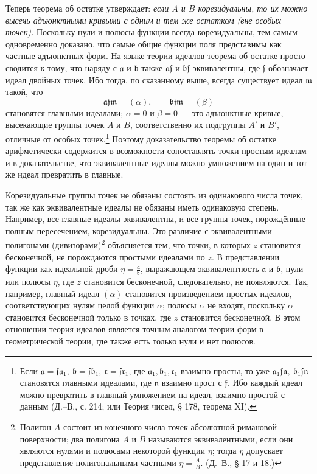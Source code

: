 \documentclass[11pt]{article}
\providecommand{\frf}{\mathfrak f}
\providecommand{\fra}{\mathfrak a}
\providecommand{\frb}{\mathfrak b}
\providecommand{\frr}{\mathfrak r}
\providecommand{\frm}{\mathfrak m}
\begin{document}
Теперь теорема об остатке утверждает: \emph{если \(A\) и \(B\) корезидуальны, то их можно высечь адъюнктными кривыми с одним и тем же остатком (вне особых точек).} Поскольку нули и полюсы функции всегда корезидуальны, тем самым одновременно доказано, что самые общие функции поля представимы как частные адъюнктных форм. На языке теории идеалов теорема об остатке просто сводится к тому, что наряду с \(\fra\) и \(\frb\) также \(\fra\frf\) и \(\frb\frf\) эквивалентны, где \(\frf\) обозначает идеал двойных точек. Ибо тогда, по сказанному выше, всегда существует идеал \(\frm\) такой, что
\[
\fra\frf\frm=(\alpha),\qquad \frb\frf\frm=(\beta)
\]
становятся главными идеалами; \(\alpha=0\) и \(\beta=0\) --- это адъюнктные кривые, высекающие группы точек \(A\) и \(B\), соответственно их подгруппы \(A'\) и \(B'\), отличные от особых точек.\footnote{Если \(\fra=\frf\fra_1,\ \frb=\frf\frb_1,\ \frr=\frf\frr_1\), где \(\fra_1,\frb_1,\frr_1\) взаимно просты, то уже \(\fra_1\frf\mathfrak n,\ \frb_1\frf\mathfrak n\) становятся главными идеалами, где \(\mathfrak n\) взаимно прост с \(\frf\). Ибо каждый идеал можно превратить в главный умножением на идеал, взаимно простой с данным (Д.--В., с. 214; или Теория чисел, § 178, теорема XI).} Поэтому доказательство теоремы об остатке арифметически содержится в возможности сопоставлять точки простым идеалам и в доказательстве, что эквивалентные идеалы можно умножением на один и тот же идеал превратить в главные.

Корезидуальные группы точек не обязаны состоять из одинакового числа точек, так же как эквивалентные идеалы не обязаны иметь одинаковую степень. Например, все главные идеалы эквивалентны, и все группы точек, порождённые полным пересечением, корезидуальны. Это различие с эквивалентными полигонами (дивизорами)\footnote{Полигон \(A\) состоит из конечного числа точек абсолютной римановой поверхности; два полигона \(A\) и \(B\) называются эквивалентными, если они являются нулями и полюсами некоторой функции \(\eta\); тогда \(\eta\) допускает представление полигональными частными \(\eta=\frac{A}{B}\). (Д.--В., § 17 и 18.)} объясняется тем, что точки, в которых \(z\) становится бесконечной, не порождаются простыми идеалами по \(z\). В представлении функции как идеальной дроби \(\eta=\frac{\fra}{\frb}\), выражающем эквивалентность \(\fra\) и \(\frb\), нули или полюсы \(\eta\), где \(z\) становится бесконечной, следовательно, не появляются. Так, например, главный идеал \((\alpha)\) становится произведением простых идеалов, соответствующих нулям целой функции \(\alpha\); полюсы \(\alpha\) не входят, поскольку \(\alpha\) становится бесконечной только в точках, где \(z\) становится бесконечной. В этом отношении теория идеалов является точным аналогом теории форм в геометрической теории, где также есть только нули и нет полюсов.
\end{document}
